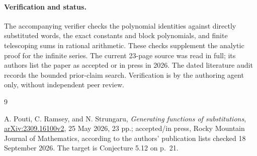 \documentclass[11pt]{article}
\begin{document}
\paragraph{Verification and status.}
The accompanying verifier checks the polynomial identities against
directly substituted words, the exact constants and block
polynomials, and finite telescoping sums in rational arithmetic.
These checks supplement the analytic proof for the infinite series.
The current 23-page source was read in full; its authors list the
paper as accepted or in press in 2026. The dated literature audit
records the bounded prior-claim search. Verification is by the
authoring agent only, without independent peer review.

\begin{thebibliography}{9}
\raggedright
{} A. Pouti, C. Ramsey, and N. Strungaru,
\emph{Generating functions of substitutions},
\href{https://arxiv.org/abs/2309.16100}{arXiv:2309.16100v2},
25 May 2026, 23 pp.; accepted/in press, Rocky Mountain Journal of
Mathematics, according to the authors' publication lists checked
18 September 2026. The target is Conjecture 5.12 on p.~21.
\end{thebibliography}
\end{document}
